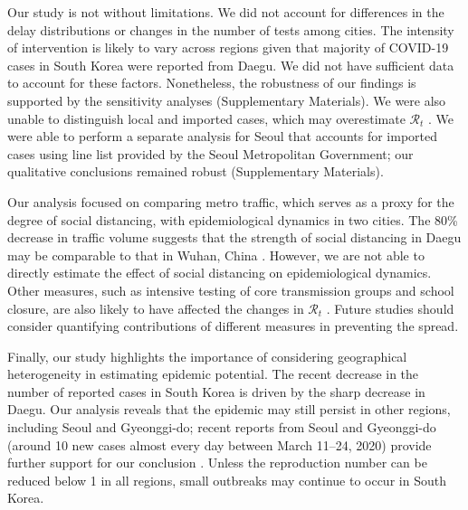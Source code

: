 \documentclass[12pt]{article}
\begin{document}
Our study is not without limitations.
We did not account for differences in the delay distributions or changes in the number of tests among cities.
The intensity of intervention is likely to vary across regions given that majority of COVID-19 cases in South Korea were reported from Daegu.
We did not have sufficient data to account for these factors.
Nonetheless, the robustness of our findings is supported by the sensitivity analyses (Supplementary Materials).
We were also unable to distinguish local and imported cases, which may overestimate $\mathcal R_t$ \citep{thompson2019improved}.
We were able to perform a separate analysis for Seoul that accounts for imported cases using line list provided by the Seoul Metropolitan Government; our qualitative conclusions remained robust (Supplementary Materials).

Our analysis focused on comparing metro traffic, which serves as a proxy for the degree of social distancing, with epidemiological dynamics in two cities.
The 80\% decrease in traffic volume suggests that the strength of social distancing in Daegu may be comparable to that in Wuhan, China \citep{lai2020effect}.
However, we are not able to directly estimate the effect of social distancing on epidemiological dynamics.
Other measures, such as intensive testing of core transmission groups and school closure, are also likely to have affected the changes in $\mathcal R_t$ \citep{kcdc}.
Future studies should consider quantifying contributions of different measures in preventing the spread.

Finally, our study highlights the importance of considering geographical heterogeneity in estimating epidemic potential.
The recent decrease in the number of reported cases in South Korea is driven by the sharp decrease in Daegu.
Our analysis reveals that the epidemic may still persist in other regions, including Seoul and Gyeonggi-do;
recent reports from Seoul and Gyeonggi-do (around 10 new cases almost every day between March 11--24, 2020) provide further support for our conclusion \citep{kcdc}.
Unless the reproduction number can be reduced below 1 in all regions, small outbreaks may continue to occur in South Korea.

\pagebreak



\pagebreak


\end{document}
